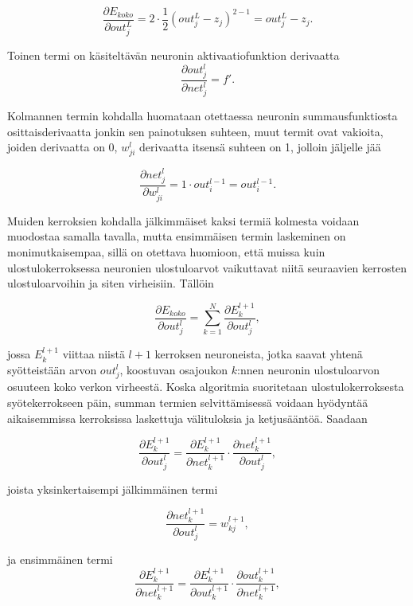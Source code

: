 \documentclass[finnish]{tktltiki2}
\theoremstyle{definition}
\theoremstyle{remark}
\begin{document}
    $$\frac{\partial E_{koko}}{\partial out_j^{L}} = 2 \cdot \frac{1}{2} (out_{j}^{L} - z_j)^{2-1} = out_{j}^{L} - z_j.$$
    
    \noindent Toinen termi on käsiteltävän neuronin aktivaatiofunktion derivaatta
    $$\frac{\partial out_j^{l}}{\partial net_j^{l}} = f'.$$

    \noindent Kolmannen termin kohdalla huomataan otettaessa neuronin summausfunktiosta osittaisderivaatta jonkin sen painotuksen suhteen, muut termit ovat vakioita, joiden derivaatta on 0, $w_{ji}^l$ derivaatta itsensä suhteen on 1, jolloin jäljelle jää

    $$ \frac{\partial net_j^{l}}{\partial w_{ji}^l} = 1 \cdot out_i^{l-1} = out_i^{l-1}. $$
    
    Muiden kerroksien kohdalla jälkimmäiset kaksi termiä kolmesta voidaan muodostaa samalla tavalla, mutta ensimmäisen termin laskeminen on monimutkaisempaa, sillä on otettava huomioon, että muissa kuin ulostulokerroksessa neuronien ulostuloarvot vaikuttavat niitä seuraavien kerrosten ulostuloarvoihin ja siten virheisiin. Tällöin 

    $$ \frac{\partial E_{koko}}{\partial out_j^l} = \sum_{k=1}^{N} \frac{\partial E_{k}^{l+1}}{\partial out_j^l},$$

    jossa $ E_{k}^{l+1} $ viittaa niistä $l+1$ kerroksen neuroneista, jotka saavat yhtenä syötteistään arvon $out_j^l$, koostuvan osajoukon $k$:nnen neuronin ulostuloarvon osuuteen koko verkon virheestä. Koska algoritmia suoritetaan ulostulokerroksesta syötekerrokseen päin, summan termien selvittämisessä voidaan hyödyntää aikaisemmissa kerroksissa laskettuja välituloksia ja ketjusääntöä. Saadaan

    $$ \frac{\partial E_{k}^{l+1}}{\partial out_j^l} = \frac{\partial E_{k}^{l+1}}{\partial net_k^{l+1}} \cdot \frac{\partial net_k^{l+1}}{\partial out_j^l}, $$

    \noindent joista yksinkertaisempi jälkimmäinen termi
    
    $$ \frac{\partial net_k^{l+1}}{\partial out_j^l} = w_{kj}^{l+1}, $$

    \noindent ja ensimmäinen termi
    $$ \frac{\partial E_{k}^{l+1}}{\partial net_k^{l+1}} = \frac{\partial E_{k}^{l+1}}{\partial out_k^{l+1}} \cdot \frac{\partial out_k^{l+1}}{\partial net_k^{l+1}}, $$
\end{document}
